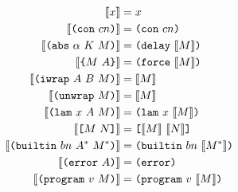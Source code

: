 \documentclass[../plutus-core-specification.tex]{subfiles}
\begin{document}
\begin{minipage}{\linewidth}
    \centering
    \begin{align*}%
       \erase{x}                      &= x                            \\
       \erase{\con{cn}}               &= \con{cn}                     \\
       \erase{\abs{\alpha}{K}{M}}     &= \delay{\erase{M}}            \\
       \erase{\inst{M}{A}}            &= \force{\erase{M}}            \\
       \erase{\iwrap{A}{B}{M}}        &= \erase{M}                    \\
       \erase{\unwrap{M}}             &= \erase{M}                    \\
       \erase{\lam{x}{A}{M}}          &= \lamU{x}{\erase{M}}          \\
       \erase{\app{M}{N}}             &= \appU{\erase{M}}{\erase{N}}  \\
       \erase{\builtin{bn}{A^*}{M^*}} &= \builtinU{bn}{\erase{M^*}}   \\
       \erase{\error{A}}              &= \errorU{}                   \\
       \erase{\version{v}{M}}        &= \version{v}{\erase{M}}
    \end{align*}
    \label{fig:type-erasure}
\end{minipage}
\end{document}
